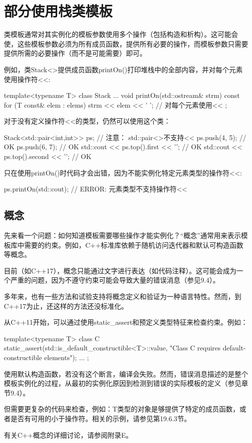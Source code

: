 \section{部分使用栈类模板}

类模板通常对其实例化的模板参数使用多个操作（包括构造和析构）。这可能会使，这些模板参数必须为所有成员函数，提供所有必要的操作，而模板参数只需要提供所需的必要操作（而不是可能需要）即可。

例如，类Stack<>提供成员函数printOn()打印堆栈中的全部内容，并对每个元素使用操作符<{}<:

\begin{cpp}
template<typename T>
class Stack {
	...
	void printOn(std::ostream& strm) const {
		for (T const& elem : elems) {
			strm << elem << ' '; // 对每个元素使用<<
		}
	}
};
\end{cpp}

对于没有定义操作符<{}<的类型，仍然可以使用这个类：

\begin{cpp}
Stack<std::pair<int,int>> ps; // 注意： std::pair<>不支持<<
ps.push({4, 5}); // OK
ps.push({6, 7}); // OK
std::cout << ps.top().first << '\n'; // OK
std::cout << ps.top().second << '\n'; // OK
\end{cpp}

只在使用printOn()时代码才会出错，因为不能实例化特定元素类型的操作符<{}<:

\begin{cpp}
ps.printOn(std::cout); // ERROR: 元素类型不支持操作符<<
\end{cpp}

\subsection{概念}

先来看一个问题：如何知道模板需要哪些操作才能实例化？“概念”通常用来表示模板库中需要的约束。例如，C++标准库依赖于随机访问迭代器和默认可构造函数等概念。

目前（如C++17），概念只能通过文字进行表达（如代码注释）。这可能会成为一个严重的问题，因为不遵守约束可能会导致大量的错误消息（参见9.4）。

多年来，也有一些方法和试验支持将概念定义和验证为一种语言特性。然而，到C++17为止，还这样的方法还没标准化。

从C++11开始，可以通过使用static\_assert和预定义类型特征来检查约束。例如：

\begin{cpp}
template<typename T>
class C {
	static_assert(std::is_default_constructible<T>::value,
	"Class C requires default-constructible elements");
	...
};
\end{cpp}

使用默认构造函数，若没有这个断言，编译会失败。然而，错误消息描述的是整个模板实例化的过程，从最初的实例化原因到检测到错误的实际模板的定义（参见章节9.4）。

但需要更复杂的代码来检查，例如：T类型的对象是够提供了特定的成员函数，或者是否有可用的小于操作符。相关的示例，请参见第19.6.3节。

有关C++概念的详细讨论，请参阅附录E。















